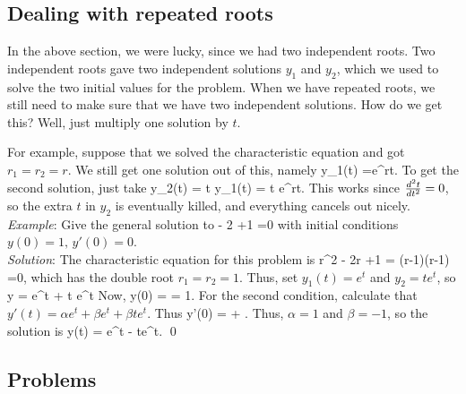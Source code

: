 \documentclass[12pt]{article}
\begin{document}
\subsection{Dealing with repeated roots}
In the above section, we were lucky, since we had two independent roots.
Two independent roots gave two independent solutions $y_1$ and $y_2$, which
we used to solve the two initial values for the problem. When we have 
repeated roots, we still need to make sure that we have two independent 
solutions. How do we get this? Well, just multiply one solution by $t$.

For example, suppose that we solved the characteristic equation and got 
$r_1=r_2=r$. We still get one solution out of this, namely
\be 
y_1(t) =e^{rt}.
\ee
To get the second solution, just take
\be 
y_2(t) = t y_1(t) = t e^{rt}.
\ee
This works since $\frac{d^2 t}{d t^2}=0$, so the extra $t$ in $y_2$ is eventually
killed, and everything cancels out nicely.
\\

\noindent\emph{Example}: Give the general solution to
\be 
{} - 2 +1 =0
\ee
with initial conditions $y(0) =1, \, y'(0) =0.$\\
\noindent\emph{Solution}:
The characteristic equation for this problem is
\be 
r^2 - 2r +1 = (r-1)(r-1) =0,
\ee
which has the double root $r_1=r_2=1$. Thus, set 
$y_1(t) = e^t$ and $y_2=t e^t$, so
\be 
y = \alpha e^t + \beta t e^t
\ee
Now,
\be 
y(0) = \alpha = 1.
\ee
For the second condition, calculate that 
$y'(t) = \alpha e^t + \beta e^t + \beta te^t$. Thus
\be 
y'(0) = \alpha + .
\ee
Thus, $\alpha=1$ and $\beta =-1$, so the solution is
\be 
y(t) = e^t - te^t. \qed
\ee


\subsection{Problems}
\end{document}
